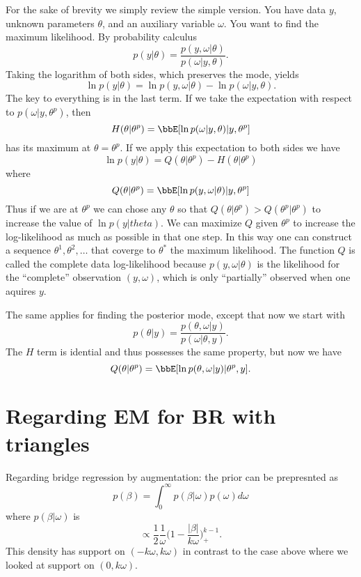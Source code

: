 \documentclass{article}
\begin{document}
For the sake of brevity we simply review the simple version.  You have data $y$,
unknown parameters $\theta$, and an auxiliary variable $\omega$.  You want to
find the maximum likelihood.  By probability calculus
\begin{displaymath}
\label{eqn:marginal}
p(y|\theta) = \frac{p(y,\omega | \theta)}{p(\omega | y, \theta)}.
\end{displaymath}
Taking the logarithm of both sides, which preserves the mode, yields
\[
\ln p(y | \theta) = \ln p(y,\omega | \theta) - \ln p(\omega | y, \theta).
\]
The key to everything is in the last term.  If we take the expectation with
respect to $p(\omega | y, \theta^p)$, then
\[
H(\theta | \theta^p) = \bbE [ \ln p(\omega | y, \theta) | y, \theta^p ]
\]
has its maximum at $\theta = \theta^p$.  If we apply this expectation to both
sides we have
\[
\ln p(y | \theta) = Q(\theta | \theta^p) - H(\theta | \theta^p)
\]
where
\[
Q(\theta | \theta^p) = \bbE[ \ln p(y,\omega | \theta) | y, \theta^p ]
\]
Thus if we are at $\theta^p$ we can chose any $\theta$ so that $Q(\theta |
\theta^p) > Q(\theta^p | \theta^p)$ to increase the value of $\ln p(y | theta)$.
We can maximize $Q$ given $\theta^p$ to increase the log-likelihood as much as
possible in that one step.  In this way one can construct a sequence $\theta^1,
\theta^2, \ldots$ that coverge to $\theta^*$ the maximum likelihood.  The
function $Q$ is called the complete data log-likelihood because $p(y, \omega |
\theta)$ is the likelihood for the ``complete'' observation $(y, \omega)$, which
is only ``partially'' observed when one aquires $y$.

The same applies for finding the posterior mode, except that now we start with
\[
p(\theta | y) = \frac{p(\theta, \omega | y)}{p(\omega | \theta, y)}.
\]
The $H$ term is idential and thus possesses the same property, but now we have
\[
Q(\theta | \theta^p) = \bbE[ \ln p(\theta, \omega | y) | \theta^p, y ].
\]

\section{Regarding EM for BR with triangles}

Regarding bridge regression by augmentation: the prior can be prepresnted as
\[
p(\beta) = \int_0^\infty p(\beta | \omega) p(\omega) d \omega
\]
where $p(\beta | \omega)$ is 
\[
\propto \frac{1}{2} \frac{1}{\omega} \Big( 1 - \frac{|\beta|}{k\omega}
\Big)^{k-1}_+.
\]
This density has support on $(-k\omega, k \omega)$ in contrast to the case above
where we looked at support on $(0, k \omega)$.
\end{document}
